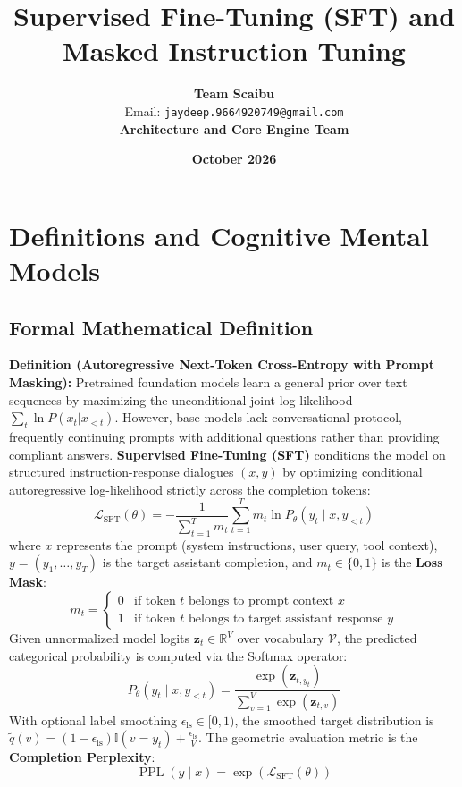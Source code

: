 \documentclass[11pt,a4paper]{article}
\title{\textbf{Supervised Fine-Tuning (SFT) and Masked Instruction Tuning}}
\author{\textbf{Team Scaibu} \\ \small Email: \texttt{jaydeep.9664920749@gmail.com} \\ \small \textbf{Architecture and Core Engine Team}}
\date{\textbf{October 2026}}
\theoremstyle{definition}
\begin{document}
\maketitle

\section{Definitions and Cognitive Mental Models}

\subsection{Formal Mathematical Definition}
\textbf{Definition (Autoregressive Next-Token Cross-Entropy with Prompt Masking):}
Pretrained foundation models learn a general prior over text sequences by maximizing the unconditional joint log-likelihood $\sum_{t} \ln P(x_t | x_{<t})$. However, base models lack conversational protocol, frequently continuing prompts with additional questions rather than providing compliant answers. \textbf{Supervised Fine-Tuning (SFT)} conditions the model on structured instruction-response dialogues $(x, y)$ by optimizing conditional autoregressive log-likelihood strictly across the completion tokens:
{\boldmath
\begin{equation}
\mathcal{L}_{\text{SFT}}(\theta) = - \frac{1}{\sum_{t=1}^T m_t} \sum_{t=1}^T m_t \ln P_\theta(y_t \mid x, y_{<t})
\end{equation}
}
where $x$ represents the prompt (system instructions, user query, tool context), $y = (y_1, \dots, y_T)$ is the target assistant completion, and $m_t \in \{0, 1\}$ is the \textbf{Loss Mask}:
{\boldmath
\begin{equation}
m_t = \begin{cases} 0 & \text{if token } t \text{ belongs to prompt context } x \\ 1 & \text{if token } t \text{ belongs to target assistant response } y \end{cases}
\end{equation}
}
Given unnormalized model logits $\mathbf{z}_t \in \mathbb{R}^V$ over vocabulary $\mathcal{V}$, the predicted categorical probability is computed via the Softmax operator:
{\boldmath
\begin{equation}
P_\theta(y_t \mid x, y_{<t}) = \frac{\exp(\mathbf{z}_{t, y_t})}{\sum_{v=1}^V \exp(\mathbf{z}_{t, v})}
\end{equation}
}
With optional label smoothing $\epsilon_{\text{ls}} \in [0, 1)$, the smoothed target distribution is $\tilde{q}(v) = (1 - \epsilon_{\text{ls}})\mathbb{I}(v = y_t) + \frac{\epsilon_{\text{ls}}}{V}$. The geometric evaluation metric is the \textbf{Completion Perplexity}:
{\boldmath
\begin{equation}
\operatorname{PPL}(y \mid x) = \exp\left( \mathcal{L}_{\text{SFT}}(\theta) \right)
\end{equation}
}
\end{document}
